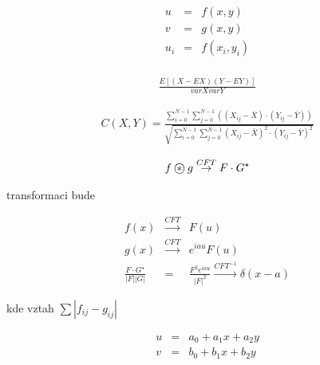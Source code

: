 \begin{itemize} 
\end{itemize}



\begin{eqnarray}
u&=&f(x,y)\\
v&=&g(x,y)\\
u_i&=&f(x_i,y_i)\\
\end{eqnarray}

\begin{itemize}
\end{itemize}


\begin{itemize}

\begin{eqnarray}
\frac{E[(X-EX)(Y-EY)]}{varX varY}
\end{eqnarray}


\begin{eqnarray}
C(X,Y)=\frac{\sum\limits_{i=0}^{N-1}
\sum\limits_{j=0}^{N-1}((X_{ij}-\bar{X})\cdot(Y_{ij}-\bar{Y}))}
{\sqrt{\sum\limits_{i=0}^{N-1}\sum\limits_{j=0}^{N-1}(X_{ij}-\bar{X})^2\cdot(Y_{ij}-\bar{Y})^2}}
\end{eqnarray}



\begin{eqnarray}
f\corr g \stackrel{CFT}{\rightarrow}F\cdot G^\star
\end{eqnarray}


transformaci bude

\begin{eqnarray}
f(x)&\stackrel{CFT}{\rightarrow}&F(u)\\
g(x)&\stackrel{CFT}{\rightarrow}&e^{iau}F(u)\\
\frac{F\cdot G^\star}{|F||G|}&=&\frac{F^2e^{iau}}{|F|^2}\stackrel{CFT^{-1}}{\longrightarrow}\delta(x-a)
\end{eqnarray}


 kde vztah $\sum|f_{ij}-g_{ij}|$
\end{itemize}



\begin{itemize}




 \begin{itemize}
 \end{itemize}
\end{itemize}


\begin{eqnarray}
u&=&a_0+a_1x+a_2y\nonumber\\
v&=&b_0+b_1x+b_2y\label{afinita}
\end{eqnarray}


